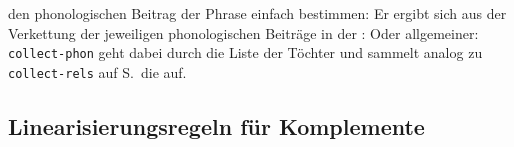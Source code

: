 den phonologischen Beitrag der Phrase einfach bestimmen: Er ergibt sich aus der Verkettung der
jeweiligen phonologischen Beiträge in der \dtrsl:
\ea
{}
\z
Oder allgemeiner:
\ea
{} \impl\\
\z
\texttt{collect-phon} geht dabei durch die Liste der Töchter und sammelt analog zu
\texttt{collect-rels} auf S.\,\pageref{constraint-collect-rels} die \phonwe auf.
%

\subsection{Linearisierungsregeln für Komplemente}

